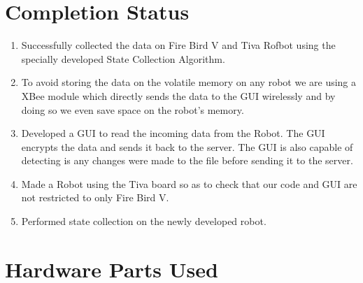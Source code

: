 \documentclass[a4paper,12pt,oneside]{book}
\begin{document}
\section{Completion Status}

\begin{enumerate}

    \item Successfully collected the data on Fire Bird V and Tiva Rofbot using the specially developed State Collection Algorithm.
    \item To avoid storing the data on the volatile memory on any robot we are using a XBee module which directly sends the data to the GUI wirelessly and by doing so we even save space on the robot's memory.
    \item Developed a GUI to read the incoming data from the Robot. The GUI encrypts the data and sends it back to the server. The GUI is also capable of detecting is any changes were made to the file before sending it to the server.
    \item Made a Robot using the Tiva board so as to check that our code and GUI are not restricted to only Fire Bird V.
    \item Performed state collection on the newly developed robot.
\newpage

\end{enumerate}

\section{Hardware Parts Used}
\end{document}
